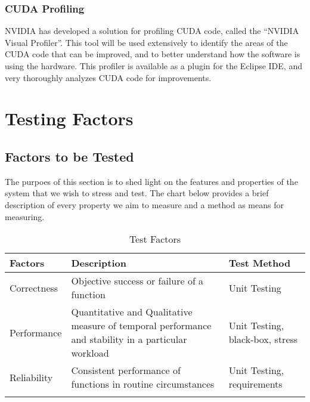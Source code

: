 \documentclass[12pt]{article}
\begin{document}
\subsubsection{CUDA Profiling}
NVIDIA has developed a solution for profiling CUDA code, called the ``NVIDIA Visual Profiler''. This tool will be used extensively to identify the areas of the CUDA code that can be improved, and to better understand how the software is using the hardware. This profiler is available as a plugin for the Eclipse IDE, and very thoroughly analyzes CUDA code for improvements.

\newpage
\section{Testing Factors}

\subsection{Factors to be Tested} %
The purpoes of this section is to shed light on the features and properties of the system that we wish to stress and test. The chart below provides a brief description of every property we aim to measure and a method as means for measuring.\\

\begin{table}[h]
\centering
\caption{Test Factors}
\begin{tabular}{>{\raggedright\arraybackslash}p{}>{\raggedright\arraybackslash}p{}>{\raggedright\arraybackslash}p{}}
\Xhline{2\arrayrulewidth}
\bf Factors & \bf Description & \bf Test Method\\\hline
Correctness & Objective success or failure of a function & Unit Testing\\\hline
Performance & Quantitative and Qualitative measure of temporal performance and stability in a particular workload & Unit Testing, black-box, stress\\\hline
Reliability & Consistent performance of functions in routine circumstances & Unit Testing, requirements\\\hline
\Xhline{2\arrayrulewidth}
\end{tabular}
\end{table}
\end{document}
